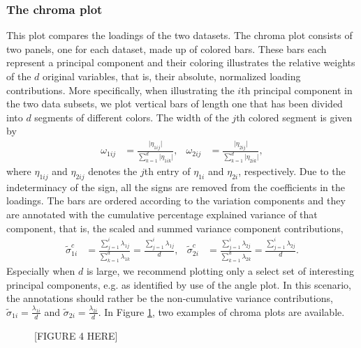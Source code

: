 \documentclass[a4paper,14pt]{article}
\begin{document}
\subsubsection*{The chroma plot}
This plot compares the loadings of the two datasets. The chroma plot consists of two panels, one for each dataset, made up of colored bars. These bars each represent a principal component and their coloring illustrates the relative weights of the $d$ original variables, that is, their absolute, normalized loading contributions. More specifically, when illustrating the $i$th principal component in the two data subsets, we plot vertical bars of length one that has been divided into $d$ segments of different colors. The width of the $j$th colored segment is given by
\begin{align*}
\omega_{1ij} &= \frac{\lvert\eta_{1ij}\rvert}{\sum_{k=1}^d \lvert\eta_{1ik}\rvert}, &
\omega_{2ij} &= \frac{\lvert\eta_{2ij}\rvert}{\sum_{k=1}^d \lvert\eta_{2ik}\rvert},
\end{align*}
where $\eta_{1ij}$ and $\eta_{2ij}$ denotes the $j$th entry of $\eta_{1i}$ and $\eta_{2i}$, respectively. Due to the indeterminacy of the sign, all the signs are removed from the coefficients in the loadings. The bars are ordered according to the variation components and they are annotated with the cumulative percentage explained variance of that component, that is, the scaled and summed variance component contributions,
\begin{align*}
\tilde\sigma^c_{1i} &= \frac{\sum_{j=1}^i \lambda_{1j}}{\sum_{k=1}^d \lambda_{1k}} = \frac{\sum_{j=1}^i \lambda_{1j}}{d}, &
\tilde\sigma^c_{2i} &= \frac{\sum_{j=1}^i \lambda_{2j}}{\sum_{k=1}^d \lambda_{2k}} = \frac{\sum_{j=1}^i \lambda_{2j}}{d}.
\end{align*}
Especially when $d$ is large, we recommend plotting only a select set of interesting principal components, e.g. as identified by use of the angle plot. In this scenario, the annotations should rather be the non-cumulative variance contributions, $\tilde\sigma_{1i} = \frac{\lambda_{1i}}{d}$ and $\tilde\sigma_{2i} = \frac{\lambda_{2i}}{d}$. In Figure  \ref{plot.simChroma}, two examples of chroma plots are available.

\begin{figure}[!h]
\caption{[FIGURE 4 HERE]}
\label{plot.simChroma}
\end{figure}
\end{document}
